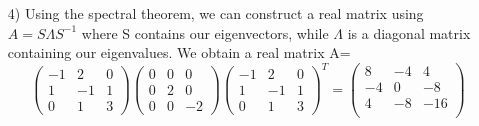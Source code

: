 \documentclass{article}
\begin{document}
\begin{enumerate}
    \item[4)] Using the spectral theorem, we can construct a real matrix using $A = S\Lambda S^{-1}$ where S contains our eigenvectors, while $\Lambda$ is a diagonal matrix containing our eigenvalues.
            We obtain a real matrix A=
            $$
            \begin{pmatrix}
                -1 & 2 & 0 \\
                1 & -1 & 1 \\
                0 & 1 & 3 
            \end{pmatrix}
            \begin{pmatrix}
                0 & 0 & 0 \\
                0 & 2 & 0 \\
                0 & 0 & -2 
            \end{pmatrix}
            \begin{pmatrix}
                -1 & 2 & 0 \\
                1 & -1 & 1 \\
                0 & 1 & 3 
            \end{pmatrix}^T
            = 
            \begin{pmatrix}
                8  &  -4  &   4  \\
                -4  &   0  &  -8 \\
                4  &  -8  & -16 \\
            \end{pmatrix}
            $$
\end{enumerate}
\end{document}
